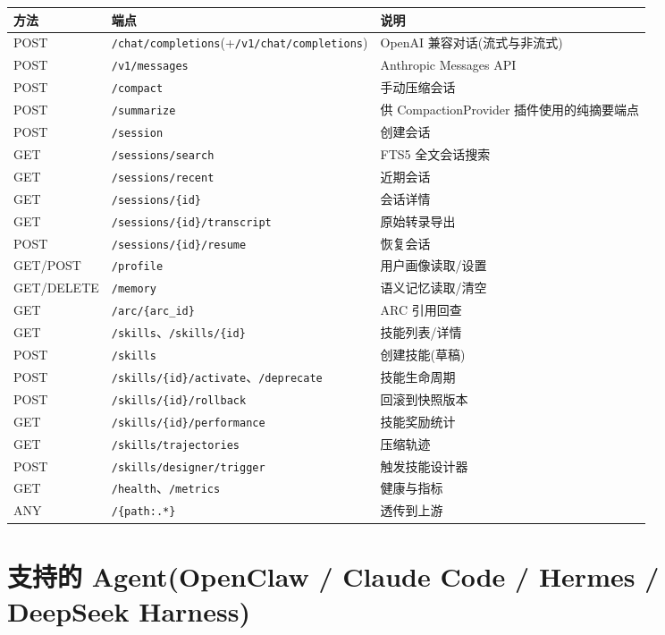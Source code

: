 \documentclass[11pt,a4paper]{article}
\begin{document}
\begin{longtable}{@{}llp{7.5cm}@{}}
  \toprule
  方法 & 端点 & 说明 \\
  \midrule
  POST & \texttt{/chat/completions}(+\texttt{/v1/chat/completions}) & OpenAI 兼容对话(流式与非流式) \\
  POST & \texttt{/v1/messages} & Anthropic Messages API \\
  POST & \texttt{/compact} & 手动压缩会话 \\
  POST & \texttt{/summarize} & 供 CompactionProvider 插件使用的纯摘要端点 \\
  POST & \texttt{/session} & 创建会话 \\
  GET & \texttt{/sessions/search} & FTS5 全文会话搜索 \\
  GET & \texttt{/sessions/recent} & 近期会话 \\
  GET & \texttt{/sessions/\{id\}} & 会话详情 \\
  GET & \texttt{/sessions/\{id\}/transcript} & 原始转录导出 \\
  POST & \texttt{/sessions/\{id\}/resume} & 恢复会话 \\
  GET/POST & \texttt{/profile} & 用户画像读取/设置 \\
  GET/DELETE & \texttt{/memory} & 语义记忆读取/清空 \\
  GET & \texttt{/arc/\{arc\_id\}} & ARC 引用回查 \\
  GET & \texttt{/skills}、\texttt{/skills/\{id\}} & 技能列表/详情 \\
  POST & \texttt{/skills} & 创建技能(草稿) \\
  POST & \texttt{/skills/\{id\}/activate}、\texttt{/deprecate} & 技能生命周期 \\
  POST & \texttt{/skills/\{id\}/rollback} & 回滚到快照版本 \\
  GET & \texttt{/skills/\{id\}/performance} & 技能奖励统计 \\
  GET & \texttt{/skills/trajectories} & 压缩轨迹 \\
  POST & \texttt{/skills/designer/trigger} & 触发技能设计器 \\
  GET & \texttt{/health}、\texttt{/metrics} & 健康与指标 \\
  ANY & \texttt{/\{path:.*\}} & 透传到上游 \\
  \bottomrule
\end{longtable}

\section{支持的 Agent(OpenClaw / Claude Code / Hermes / DeepSeek Harness)}
\end{document}
